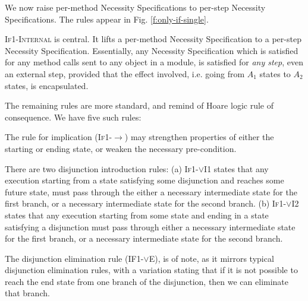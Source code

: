 We now raise per-method Necessity Specifications 
to per-step Necessity Specifications. 
The rules appear in Fig. \ref{f:only-if-single}.

\textsc{If1-Internal} is central. It
 lifts a per-method Necessity Specification to a per-step Necessity Specification.
Essentially, any Necessity Specification which is satisfied for any method
calls sent to any object in a module, is satisfied for \emph{any step}, even
an external step, provided that the effect involved, i.e. going from $A_1$ states to
$A_2$ states, is encapsulated.

 The remaining rules are more standard, and remind of Hoare logic rule of consequence.
 We have five such rules:
 
The  rule for implication (\textsc{If1-$\longrightarrow$}) may strengthen
 properties of either the starting or ending state, or 
weaken the necessary pre-condition. 

There are two disjunction introduction rules: 
(a) \textsc{If1-$\vee$I1} states that any execution
starting from a state satisfying some disjunction and reaches some future state, 
must pass through the either a necessary 
intermediate state for the first branch, or a necessary 
intermediate state for the second branch.
(b) \textsc{If1-$\vee$I2} states that any execution 
starting from some state and ending in a state satisfying a disjunction
must pass through either a necessary intermediate state for 
the first branch, or a necessary intermediate state for the second branch.


The disjunction
elimination rule (\textsc{IF1-$\vee$E}), 
is of note, as it mirrors typical disjunction elimination
rules, with a variation stating that if it is not possible  to reach 
the end state from one branch of the disjunction, then we can eliminate 
that branch. 



